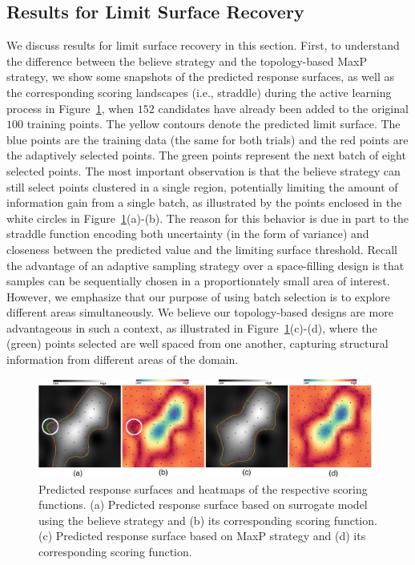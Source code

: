 \subsection{Results for Limit Surface Recovery}
\label{sec:limit_results}
We discuss results for limit surface recovery in this section.
%
First, to understand the difference between the believe strategy and the topology-based MaxP strategy, we show some snapshots of the predicted response surfaces, as well as the corresponding scoring landscapes  (i.e., straddle) during the active learning process in Figure~\ref{fig:exampleLimits}, when $152$ candidates have already been added to the original $100$ training points.
%
The yellow contours denote the predicted limit surface.
%
The blue points are the training data (the same for both trials) and the red points are the adaptively selected points.
%
The green points represent the next batch of eight selected points.
%
The most important observation is that the believe strategy can still select points clustered in a single region, potentially limiting the amount of information gain from a single batch, as illustrated by the points enclosed in the white circles in Figure~\ref{fig:exampleLimits}(a)-(b).
%
The reason for this behavior is due in part to the straddle function encoding both uncertainty (in the form of variance) and closeness between the predicted value and the limiting surface threshold.
%
Recall the advantage of an adaptive sampling strategy over a space-filling design is that samples can be sequentially chosen in a proportionately small area of interest.
%
However, we emphasize that our purpose of using batch selection is to explore different areas simultaneously.
%
We believe our topology-based designs are more advantageous in such a context, as illustrated in Figure~\ref{fig:exampleLimits}(c)-(d), where the (green) points selected are well spaced from one another, capturing structural information from different areas of the domain.

\begin{figure}[!t]
\centering
\includegraphics[width=0.98\textwidth]{figs/chap5/example-limits}
\caption[Predicted response surfaces and heatmaps of the respective scoring functions]{Predicted response surfaces and heatmaps of the respective scoring functions. (a) Predicted response surface based on surrogate model using
the believe strategy and (b) its corresponding scoring function.
%
(c) Predicted response surface based on MaxP strategy and (d) its
corresponding scoring function.}
\label{fig:exampleLimits}
\end{figure}

